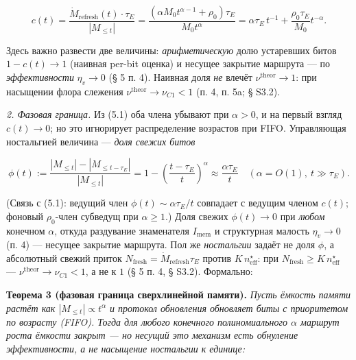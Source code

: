 \documentclass[12pt]{iopart}
\begin{document}
\begin{equation}c(t) = \frac{\dot M_{\text{refresh}}(t)\cdot\tau_E}{|M_{\le t}|} = \frac{(\alpha M_0 t^{\alpha-1} + \rho_0)\tau_E}{M_0 t^\alpha} = \alpha\tau_E\,t^{-1} + \frac{\rho_0\tau_E}{M_0}t^{-\alpha}. \tag{5.1}\end{equation}



Здесь важно развести две величины: \emph{арифметическую} долю устаревших битов \(1-c(t)\to1\) (наивная per-bit оценка) и несущее закрытие маршрута --- по \emph{эффективности} \(\eta_v\to0\) (§ 5 п. 4). Наивная доля \emph{не} влечёт \(\nu^{\text{theor}} \to 1\): при насыщении флора слежения \(\nu^{\text{theor}} \to \nu_{C1} < 1\) (п. 4, п. 5a; § S3.2).



\emph{2. Фазовая граница.} Из (5.1) оба члена убывают при \(\alpha > 0\), и на первый взгляд \(c(t) \to 0\); но это игнорирует распределение возрастов при FIFO. Управляющая ностальгией величина --- \emph{доля свежих битов}



\begin{equation}\phi(t) := \frac{|M_{\le t}| - |M_{\le t-\tau_E}|}{|M_{\le t}|} = 1 - \left(\frac{t-\tau_E}{t}\right)^\alpha \approx \frac{\alpha\tau_E}{t} \quad(\alpha = O(1),\ t \gg \tau_E). \tag{5.2}\end{equation}



(Связь с (5.1): ведущий член \(\phi(t) \sim \alpha\tau_E/t\) совпадает с ведущим членом \(c(t)\); фоновый \(\rho_0\)-член субведущ при \(\alpha \ge 1\).) Доля свежих \(\phi(t) \to 0\) при \emph{любом} конечном \(\alpha\), откуда раздувание знаменателя \(I_{\text{mem}}\) и структурная малость \(\eta_v \to 0\) (п. 4) --- несущее закрытие маршрута. Пол же \emph{ностальгии} задаёт не доля \(\phi\), а абсолютный свежий приток \(N_{\text{fresh}} = \dot M_{\text{refresh}}\tau_E\) против \(K\,n_{\text{eff}}^\star\): при \(N_{\text{fresh}} \ge K\,n_{\text{eff}}^\star\) --- \(\nu^{\text{theor}} \to \nu_{C1} < 1\), а не к \(1\) (§ 5 п. 4, § S3.2). Формально:



\textbf{Теорема 3 (фазовая граница сверхлинейной памяти).} \emph{Пусть ёмкость памяти растёт как \(|M_{\le t}| \propto t^\alpha\) и протокол обновления обновляет биты с приоритетом по возрасту (FIFO). Тогда для любого конечного полиномиального \(\alpha\) маршрут роста ёмкости закрыт --- но несущий это механизм есть обнуление эффективности, а не насыщение ностальгии к единице:}
\end{document}
